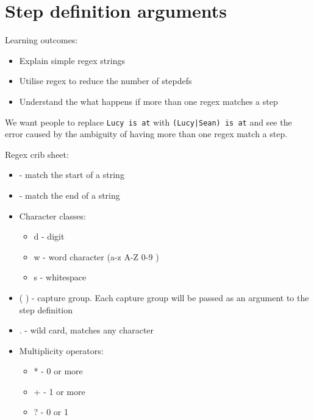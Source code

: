 \chapter*{Step definition arguments}

\ifnotes

    Learning outcomes:
    
    \begin{itemize}
        \item Explain simple regex strings
        \item Utilise regex to reduce the number of stepdefs
        \item Understand the what happens if more than one regex matches a step
    \end{itemize}
    
    We want people to replace \texttt{Lucy is at} with \texttt{(Lucy|Sean) is at} and see the error caused by the ambiguity of having more than one regex match a step.
    
    Regex crib sheet:
    
    \begin{itemize}
        \item \CARET - match the start of a string
        \item \DOLLAR - match the end of a string
        \item Character classes:
            \begin{itemize}
                \item \BACKSLASH d - digit
                \item \BACKSLASH w - word character (a-z A-Z 0-9 \textunderscore)
                \item \BACKSLASH s - whitespace
            \end{itemize}
        \item ( ) - capture group. Each capture group will be passed as an argument to the step definition
        \item . - wild card, matches any character
        \item Multiplicity operators:
            \begin{itemize}
                \item * - 0 or more
                \item + - 1 or more
                \item ? - 0 or 1
            \end{itemize}
    \end{itemize}


